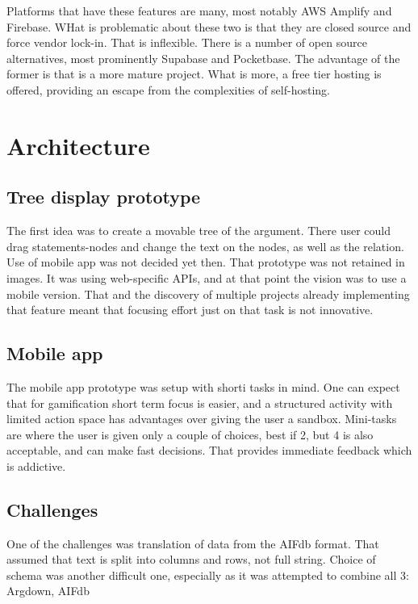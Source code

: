 \documentclass{report}
\begin{document}
Platforms that have these features are many, most notably AWS Amplify and Firebase. WHat is problematic about these two is that they are closed source and force vendor lock-in. 
\cite{noauthor_firebase_2023}
\cite{noauthor_aws-amplifyamplify-js_2023}
That is inflexible. There is a number of open source alternatives, most prominently Supabase and Pocketbase. 
\cite{noauthor_supabase-js_2023} \cite{noauthor_pocketbase_2023}
The advantage of the former is that is a more mature project. What is more, a free tier hosting is offered, providing an escape from the complexities of self-hosting. 
\cite{noauthor_pocketbase_nodate}

\section{Architecture}
\subsection{Tree display prototype}
The first idea was to create a movable tree of the argument. There user could drag statements-nodes and change the text on the nodes, as well as the relation.
Use of mobile app was not decided yet then. That prototype was not retained in images. It was using web-specific APIs, and at that point the vision was to use a mobile version. That and the discovery of multiple projects already implementing that feature meant that focusing effort just on that task is not innovative. 

\subsection{Mobile app}
The mobile app prototype was setup with shorti tasks in mind. One can expect that for gamification short term focus is easier, and a structured activity with limited action space has advantages over giving the user a sandbox. Mini-tasks are where the user is given only a couple of choices, best if 2, but 4 is also acceptable, and can make fast decisions. That provides immediate feedback which is addictive. 

\subsection{Challenges}

One of the challenges was translation of data from the AIFdb format. That assumed that text is split into columns and rows, not full string.
Choice of schema was another difficult one, especially as it was attempted to combine all 3: Argdown, AIFdb
\cite{abbott_internet_2016}
\end{document}
